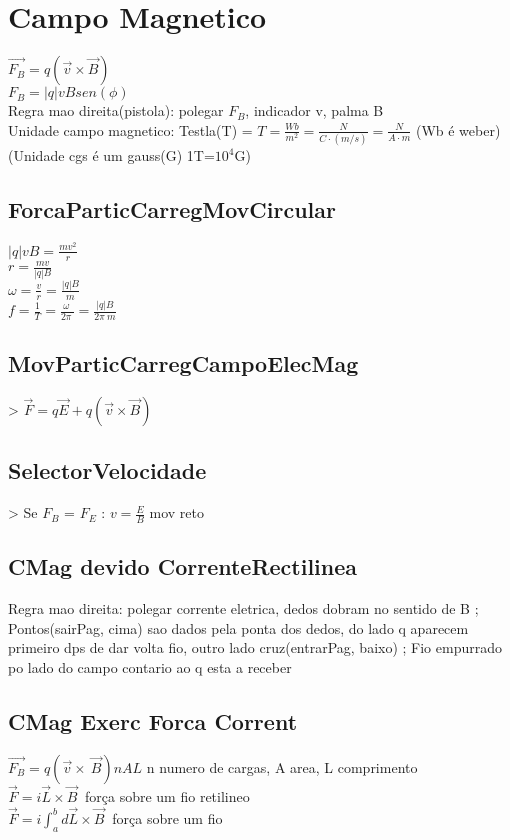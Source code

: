 \section{Campo Magnetico}
$\vec{F_B}=q\left(\vec{v}\times \vec{B}\right)$\\
$F_B=\left|q\right|vBsen\left(\phi \right)$\\
Regra mao direita(pistola): polegar $F_B$, indicador v, palma B\\
Unidade campo magnetico: Testla(T) = $T=\frac{Wb}{m^2}=\frac{N}{C\cdot \left(m/s\right)}=\frac{N}{A\cdot m}$ (Wb é weber) (Unidade cgs é um gauss(G) 1T=$10^4$G)\\
\subsection{ForcaParticCarregMovCircular}
$\left|q\right|vB=\frac{mv^2}{r}$\\
$r=\frac{mv}{\left|q\right|B}$\\
$\omega =\frac{v}{r}=\frac{\left|q\right|B}{m}$\\
$f=\frac{1}{T}=\frac{\omega \:}{2\pi \:}=\frac{\left|q\right|B}{2\pi \:m}$\\
\subsection{MovParticCarregCampoElecMag}
> $\vec{F}=q\vec{E}+q\left(\vec{v}\times \vec{B}\right)$\\
\subsection{SelectorVelocidade}
> Se $F_B$ = $F_E$ : $v=\frac{E}{B}$ mov reto\\
\subsection{CMag devido CorrenteRectilinea}
Regra mao direita: polegar corrente eletrica, dedos dobram no sentido de B ;
Pontos(sairPag, cima) sao dados pela ponta dos dedos, do lado q aparecem primeiro dps de dar volta fio, outro lado cruz(entrarPag, baixo) ;
Fio empurrado po lado do campo contario ao q esta a receber\\
\subsection{CMag Exerc Forca Corrent}
$\vec{F_B}=q\left(\vec{v}\times \:\vec{B}\right)nAL$ n numero de cargas, A area, L comprimento\\
$\vec{F}=i\vec{L}\times \vec{B}\:$ força sobre um fio retilineo\\
$\vec{F}=i\int _a^bd\vec{L}\times \vec{B}\:$ força sobre um fio\\
